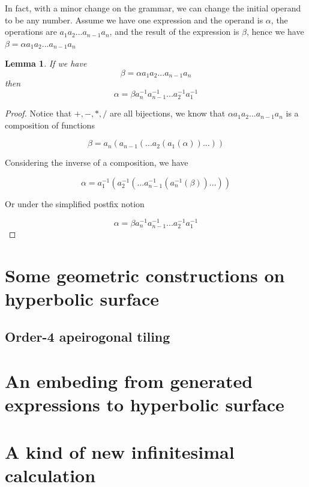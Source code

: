\documentclass{article}
\newtheorem{lemma}{Lemma}
\begin{document}
In fact, with a minor change on the grammar, we can change the initial operand to be any number.
Assume we have one expression and the operand is $\alpha$, the operations are $a_1 a_2 ... a_{n-1} a_n$, and the
result of the expression is $\beta$, hence we have $\beta = \alpha a_1 a_2 ... a_{n-1} a_n$

\begin{lemma}
\label{lemma:inverse}
If we have
$$\beta = \alpha a_1 a_2 ... a_{n-1} a_n$$
then
$$\alpha = \beta a_n^{-1} a_{n-1}^{-1} ... a_2^{-1} a_1^{-1}$$
\end{lemma}

\begin{proof}
Notice that $+, -, *, /$ are all bijections, we know that $\alpha a_1 a_2 ... a_{n-1} a_n$ is a composition of functions

$$\beta = a_n( a_{n-1}( ... a_2( a_1(\alpha) ) ... ) )$$

Considering the inverse of a composition, we have

$$\alpha = a_1^{-1}( a_2^{-1}( ... a_{n-1}^{-1}( a_n^{-1}(\beta) ) ... ) )$$

Or under the simplified postfix notion

$$\alpha = \beta a_n^{-1} a_{n-1}^{-1} ... a_2^{-1} a_1^{-1}$$

\qedhere

\end{proof}

\newpage

\section{Some geometric constructions on hyperbolic surface}\label{sec:geometry}

\subsection{Order-4 apeirogonal tiling}\label{sec:o4ataamt}

\newpage

\section{An embeding from generated expressions to hyperbolic surface}\label{sec:embeding}

\newpage

\section{A kind of new infinitesimal calculation}\label{sec:akonic}
\end{document}

